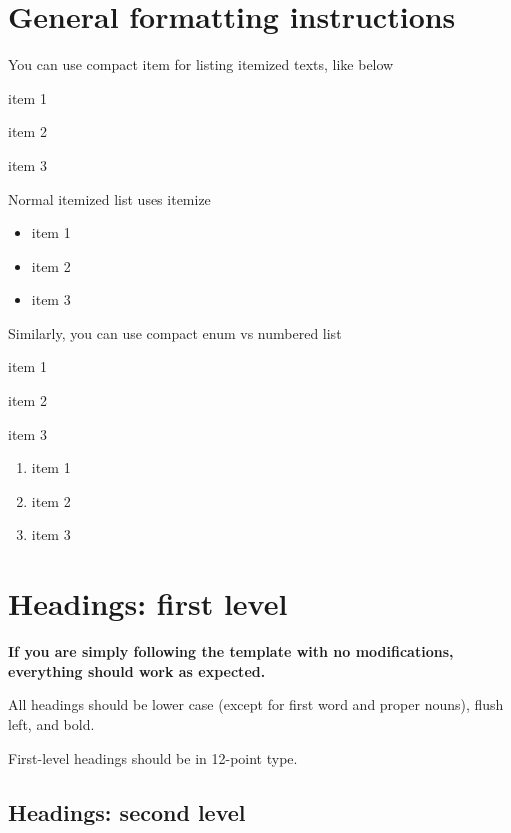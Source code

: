 \documentclass{article}
\begin{document}
\section{General formatting instructions}
\label{gen_inst}

You can use compact item for listing itemized texts, like below
\begin{compactitem}
\item item 1
\item item 2
\item item 3
\end{compactitem}

Normal itemized list uses itemize

\begin{itemize}
\item item 1
\item item 2
\item item 3
\end{itemize}

Similarly, you can use compact enum vs numbered list 

\begin{compactenum}
\item item 1
\item item 2
\item item 3
\end{compactenum}

\begin{enumerate}
\item item 1
\item item 2
\item item 3
\end{enumerate}

\section{Headings: first level}
\label{headings}

\textbf{If you are simply following the template with no modifications, everything should work as expected.}

All headings should be lower case (except for first word and proper nouns),
flush left, and bold.


First-level headings should be in 12-point type.


\subsection{Headings: second level}
\end{document}
